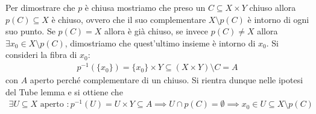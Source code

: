 \begin{demonstration}
	Per dimostrare che $p$ è chiusa mostriamo che preso un $C\subseteq X\times Y$ chiuso allora $p(C)\subseteq X$ è chiuso, ovvero che il suo complementare $X\setminus p(C)$ è intorno di ogni suo punto.\newline
	Se $p(C)=X$ allora è già chiuso, se invece $p(C)\neq X$ allora $\exists x_0\in X\setminus p(C)$, dimostriamo che quest'ultimo insieme è intorno di $x_0$. Si consideri la fibra di $x_0$:
		\begin{gather*}
			p^{-1}(\{x_0\} )=\{x_0\}\times Y \subseteq (X\times Y)\setminus C=A
		\end{gather*}
	con $A$ aperto perché complementare di un chiuso. \newline
	Si rientra dunque nelle ipotesi del Tube lemma e si ottiene che
		\begin{gather*}
			\exists U\subseteq X \text{ aperto } \colon p^{-1}(U)=U\times Y\subseteq A \implies U\cap p(C)=\emptyset \implies x_0\in U\subseteq X\setminus p(C)
		\end{gather*}
\end{demonstration}

